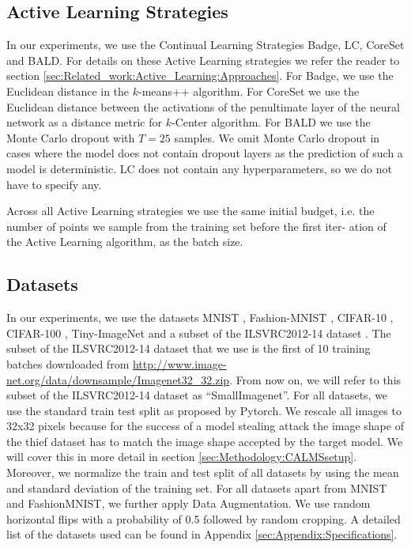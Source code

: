 \subsection{Active Learning Strategies}
\label{sec:ExperimentSetup:ALStrategies}
In our experiments, we use the Continual Learning Strategies Badge, LC, CoreSet and BALD. For details on these Active Learning strategies we refer
the reader to section \ref{sec:Related_work:Active_Learning:Approaches}. For Badge, we use the Euclidean distance in the $k$-means++ algorithm.
For CoreSet we use the Euclidean distance between the activations of the penultimate layer of the neural network as a distance metric for $k$-Center
algorithm. For BALD we use the Monte Carlo dropout with $T=25$ samples. We omit Monte Carlo dropout in cases where the model does not contain dropout
layers as the prediction of such a model is deterministic. LC does not contain any hyperparameters, so we do not have to specify any. \par
Across all Active Learning strategies we use the same initial budget, i.e. the number of points we sample from the training set before the first iter-
ation of the Active Learning algorithm, as the batch size.

\subsection{Datasets}
\label{sec:ExperimentSetup:Datasets}
In our experiments, we use the datasets MNIST \cite{mnist_web}, Fashion-MNIST \cite{xiao2017fashion}, CIFAR-10 \cite{cifar},
CIFAR-100 \cite{cifar}, Tiny-ImageNet \cite{le2015tiny} and a subset of the ILSVRC2012-14 dataset \cite{imagenet}. The subset of the ILSVRC2012-14 dataset that we
use is the first of 10 training batches downloaded from \url{http://www.image-net.org/data/downsample/Imagenet32_32.zip}. From now on, we will refer to this subset
of the ILSVRC2012-14 dataset as \enquote{SmallImagenet}. For all datasets, we use the standard train test split as proposed by Pytorch. We rescale all images to 32x32
pixels because for the success of a model stealing attack the image shape of the thief dataset has to match the image shape accepted by the target model. We will cover
this in more detail in section \ref{sec:Methodology:CALMSsetup}. Moreover, we normalize the train and test split of all datasets by using the mean and standard deviation
of the training set. For all datasets apart from MNIST and FashionMNIST, we further apply Data Augmentation. We use random horizontal flips with a probability of 0.5
followed by random cropping. A detailed list of the datasets used can be found in Appendix \ref{sec:Appendix:Specifications}. \par


